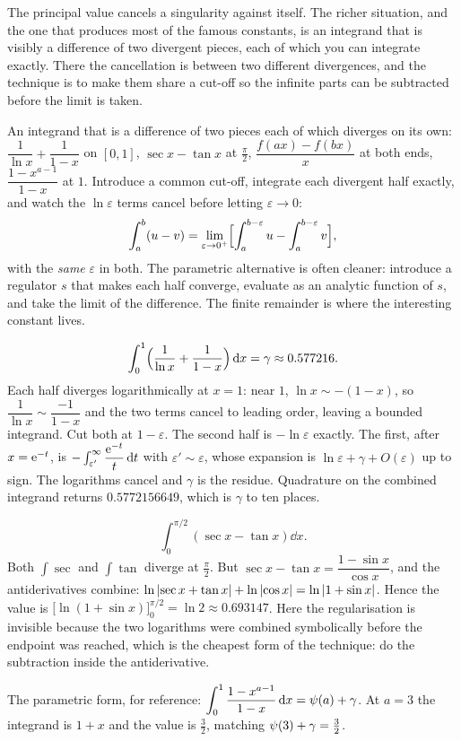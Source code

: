 The principal value cancels a singularity against itself. The richer situation, and the one that produces most of the famous constants, is an integrand that is visibly a difference of two divergent pieces, each of which you can integrate exactly. There the cancellation is between two different divergences, and the technique is to make them share a cut-off so the infinite parts can be subtracted before the limit is taken.

\cue An integrand that is a difference of two pieces each of which diverges on its own: $\dfrac{1}{\ln x}+\dfrac{1}{1-x}$ on $[0,1]$, $\sec x-\tan x$ at $\tfrac{\pi}{2}$, $\dfrac{f(ax)-f(bx)}{x}$ at both ends, $\dfrac{1-x^{a-1}}{1-x}$ at $1$.
\method Introduce a common cut-off, integrate each divergent half exactly, and watch the $\ln\varepsilon$ terms cancel before letting $\varepsilon\to0$:
\[\int_a^{b}(u-v)=\lim_{\varepsilon\to0^{+}}\Bigl[\int_a^{b-\varepsilon}u-\int_a^{b-\varepsilon}v\Bigr],\]
with the \emph{same} $\varepsilon$ in both. The parametric alternative is often cleaner: introduce a regulator $s$ that makes each half converge, evaluate as an analytic function of $s$, and take the limit of the difference. The finite remainder is where the interesting constant lives.

\begin{worked}
\[\int_0^{1}\Bigl(\frac{1}{\ln x}+\frac{1}{1-x}\Bigr)\,\mathrm{d} x=\gamma\approx0.577216.\]
Each half diverges logarithmically at $x=1$: near $1$, $\ln x\sim-(1-x)$, so $\dfrac{1}{\ln x}\sim\dfrac{-1}{1-x}$ and the two terms cancel to leading order, leaving a bounded integrand. Cut both at $1-\varepsilon$. The second half is $-\ln\varepsilon$ exactly. The first, after $x=\mathrm{e}^{-t}$, is $-\int_{\varepsilon'}^{\infty}\dfrac{\mathrm{e}^{-t}}{t}\,\mathrm{d} t$ with $\varepsilon'\sim\varepsilon$, whose expansion is $\ln\varepsilon+\gamma+O(\varepsilon)$ up to sign. The logarithms cancel and $\gamma$ is the residue. Quadrature on the combined integrand returns $0.5772156649$, which is $\gamma$ to ten places.
\end{worked}

\begin{worked}
\[\int_0^{\pi/2}(\sec x-\tan x)\dd x.\]
Both $\int\sec$ and $\int\tan$ diverge at $\tfrac{\pi}{2}$. But $\sec x-\tan x=\dfrac{1-\sin x}{\cos x}$, and the antiderivatives combine: $\ln\left\lvert \sec x+\tan x\right\rvert+\ln\left\lvert \cos x\right\rvert=\ln\left\lvert 1+\sin x\right\rvert$. Hence the value is $\bigl[\ln(1+\sin x)\bigr]_0^{\pi/2}=\ln2\approx0.693147$. Here the regularisation is invisible because the two logarithms were combined symbolically before the endpoint was reached, which is the cheapest form of the technique: do the subtraction inside the antiderivative.

The parametric form, for reference: $\displaystyle\int_0^{1}\frac{1-x^{a-1}}{1-x}\,\mathrm{d} x=\psi(a)+\gamma$. At $a=3$ the integrand is $1+x$ and the value is $\tfrac32$, matching $\psi(3)+\gamma=\tfrac32$.
\end{worked}

